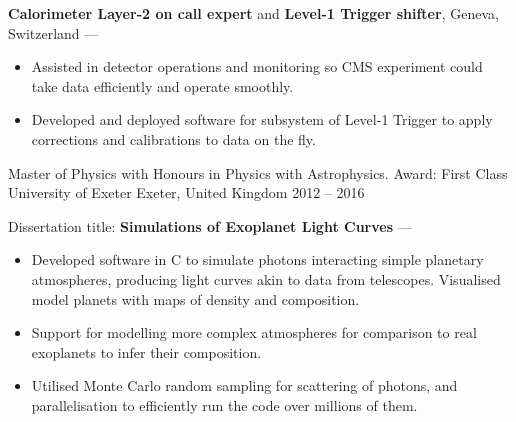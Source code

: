 \begin{cventries}
{\begin{cvitems}
            \vpaddingEduNorm
            \item {\textbf{Calorimeter Layer-2 on call expert} and \textbf{Level-1 Trigger shifter}, Geneva, Switzerland --- }
            \vpaddingEduSubpoint
            \begin{itemize}
                \item[\bullet]{Assisted in detector operations and monitoring so CMS experiment could take data efficiently and operate smoothly.}
                \vpaddingEduSubpoint
                \item[\bullet]{Developed and deployed software for subsystem of Level-1 Trigger to apply corrections and calibrations to data on the fly.}
            \end{itemize}
        \end{cvitems}
        }

    \cventry
        {Master of Physics with Honours in Physics with Astrophysics. Award: First Class}  %
        {University of Exeter}
        {Exeter, United Kingdom}
        {2012 -- 2016}
        {
        \begin{cvitems} %
            \item {Dissertation title: \textbf{Simulations of Exoplanet Light Curves} --- }
            \vpaddingEduSubpoint
            \begin{itemize}
                \item[\bullet]{Developed software in C to simulate photons interacting simple planetary atmospheres, producing light curves akin to data from telescopes. Visualised model planets with maps of density and composition.}
                \vpaddingEduSubpoint
                \item[\bullet]{Support for modelling more complex atmospheres for comparison to real exoplanets to infer their composition.}
                \vpaddingEduSubpoint
                \item[\bullet]{Utilised Monte Carlo random sampling for scattering of photons, and parallelisation to efficiently run the code over millions of them.}
            \end{itemize}
        \end{cvitems}
        } %


\end{cventries}
